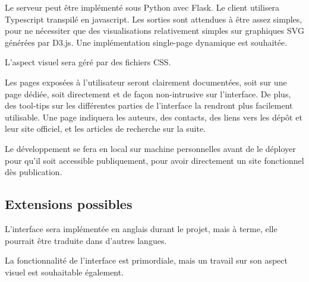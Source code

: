 Le serveur peut être implémenté sous Python avec Flask.
Le client utilisera Typescript transpilé en javascript.
Les sorties sont attendues à être assez simples,
pour ne nécessiter que des visualisations relativement simples
sur graphiques SVG générées par D3.js.
Une implémentation single-page dynamique est souhaitée.

L'aspect visuel sera géré par des fichiers CSS.

Les pages exposées à l'utilisateur seront clairement documentées,
soit sur une page dédiée,
soit directement et de façon non-intrusive sur l'interface.
De plus, des tool-tips sur les différentes parties de l'interface
la rendront plus facilement utilisable.
Une page indiquera les auteurs, des contacts,
des liens vers les dépôt et leur site officiel,
et les articles de recherche sur la suite.

Le développement se fera en local sur machine personnelles
avant de le déployer pour qu'il soit accessible publiquement,
pour avoir directement un site fonctionnel dès publication.


\subsection{Extensions possibles}

L'interface sera implémentée en anglais durant le projet,
mais à terme, elle pourrait être traduite dans d'autres langues.

La fonctionnalité de l'interface est primordiale,
mais un travail sur son aspect visuel est souhaitable également.
